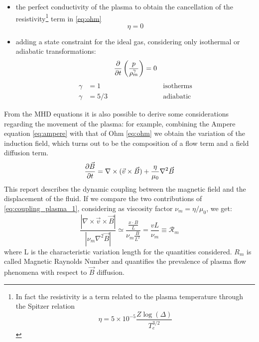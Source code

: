 \begin{itemize}
    \item the perfect conductivity of the plasma to obtain the cancellation of the resistivity\footnote{In fact the resistivity is a term related to the plasma temperature through the Spitzer relation \begin{equation}
        \eta = 5 \times 10^{-5} \frac{Z \log(\Delta)}{T_e^{3/2}}
    \end{equation}} term in \eqref{eq:ohm}
    \begin{equation}
        \eta = 0
    \end{equation}
    \item adding a state constraint for the ideal gas, considering only isothermal or adiabatic transformations:
    \begin{equation}
        \pdv{}{t}\left( \frac{p}{\rho_m^\gamma} \right) = 0
    \end{equation}
    \begin{align}
        \gamma &= 1    \hspace{3cm} & \text{isotherms} \\
        \gamma &= 5/3  \hspace{3cm} & \text{adiabatic}
    \end{align}
\end{itemize}
From the MHD equations it is also possible to derive some considerations regarding the movement of the plasma: for example, combining the Ampere equation \ref{eq:ampere} with that of Ohm \ref{eq:ohm} we obtain the variation of the induction field, which turns out to be the composition of a flow term and a field diffusion term.
\begin{equation}
    \pdv{\Vec{B}}{t} = \nabla \times ( \Vec{v} \times \Vec{B} ) + \frac{\eta}{\mu_0} \nabla^2 \Vec{B}
    \label{eq:coupling_plasma_1}
\end{equation}
This report describes the dynamic coupling between the magnetic field and the displacement of the fluid. If we compare the two contributions of \eqref{eq:coupling_plasma_1}, considering as viscosity factor $\nu_m = \eta/\mu_0$, we get:
\begin{equation}
    \frac{|\nabla \times \Vec{v} \times \Vec{B}|}{|\nu_m \nabla^2 \Vec{B}|} \simeq \frac{\frac{x \cdot B}{L}}{\nu_m\frac{B}{L^2}} = \frac{vL}{\nu_m} \equiv \mathcal{R}_m
\end{equation}
where L is the characteristic variation length for the quantities considered. $R_m$ is called Magnetic Raynolds Number and quantifies the prevalence of plasma flow phenomena with respect to $\Vec{B}$ diffusion.

